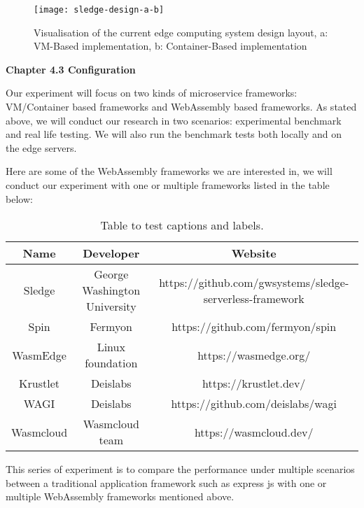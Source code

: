 \bigskip

\begin{figure}[hp]
\centering
\texttt{[image: sledge-design-a-b]}
\caption{\footnotesize{Visualisation of the current edge computing system design layout, a: VM-Based implementation, b: Container-Based implementation }}
\captionsetup{aboveskip=0pt,font=it}
\label{fig:javascript_meme}
\end{figure}

\bigskip
\bigskip

\textbf{{\Large Chapter 4.3 Configuration}}

\bigskip

Our experiment will focus on two kinds of microservice frameworks: VM/Container based frameworks and WebAssembly based frameworks. As stated above, we will conduct our research in two scenarios: experimental benchmark and real life testing. We will also run the benchmark tests both locally and on the edge servers.

Here are some of the WebAssembly frameworks we are interested in, we will conduct our experiment with one or multiple frameworks listed in the table below:

\bigskip

\begin{table}[h!]
\centering
\begin{tabular}{||c c c||} 
\hline
Name & Developer & Website \\ [0.5ex] 
\hline\hline
Sledge & George Washington University & https://github.com/gwsystems/sledge-serverless-framework \\ 
Spin & Fermyon & https://github.com/fermyon/spin \\
WasmEdge & Linux foundation & https://wasmedge.org/ \\
Krustlet & Deislabs & https://krustlet.dev/ \\
WAGI & Deislabs & https://github.com/deislabs/wagi \\
Wasmcloud & Wasmcloud team & https://wasmcloud.dev/ \\ [1ex] 
\hline
\end{tabular}
\caption{Table to test captions and labels.}
\label{table:1}
\end{table}

\bigskip
\bigskip
\bigskip
\bigskip
\bigskip

This series of experiment is to compare the performance under multiple scenarios between a traditional application framework such as express js with one or multiple WebAssembly frameworks mentioned above.

